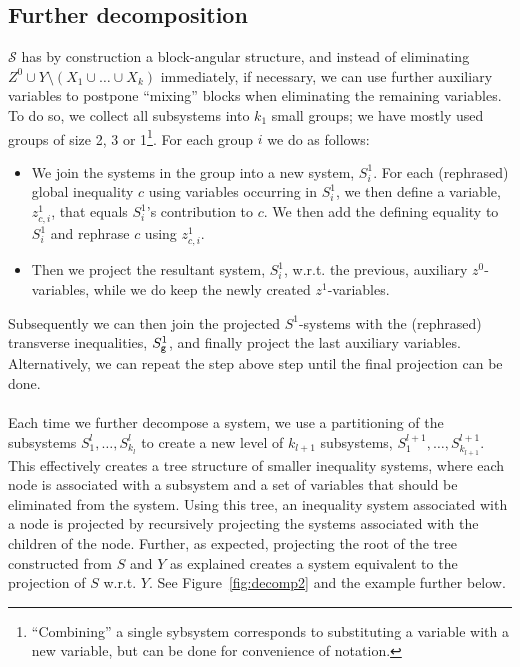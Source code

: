 \subsection{Further decomposition}
$\mathcal{S}$ has by construction a block-angular structure, and instead of eliminating $Z^0\cup Y\setminus(X_1\cup\ldots\cup X_k)$ immediately, if necessary, we can use further auxiliary variables to postpone ``mixing'' blocks when eliminating the remaining variables. 
To do so, we collect all subsystems into $k_1$ small groups; we have mostly used groups of size 2, 3 or 1\footnote{``Combining'' a single sybsystem corresponds to substituting a variable with a new variable, but can be done for convenience of notation.}.
For each group $i$ we do as follows:
\begin{itemize}\itemsep0em
\item We join the systems in the group into a new system, $S^1_i$. For each (rephrased) global inequality $c$ using variables occurring in $S^1_i$, we then define a variable, $z^1_{c,i}$, that equals $S^1_i$'s contribution to $c$. We then add the defining equality to $S^1_i$ and rephrase $c$ using $z^1_{c,i}$.

\item Then we project the resultant system, $S^1_i$, w.r.t. the previous, auxiliary $z^0$-variables, while we do keep the newly created $z^1$-variables.
\end{itemize} 
Subsequently we can then join the projected $S^1$-systems with the (rephrased) transverse inequalities, $S_{\texttt{g}}^1$, and finally project the last auxiliary variables. Alternatively, we can repeat the step above step until the final projection can be done. 
\\\\
Each time we further decompose a system, we use a partitioning of the subsystems $S^l_1, \ldots, S^l_{k_l}$ to create a new level of $k_{l+1}$ subsystems, $S^{l+1}_1,\ldots, S^{l+1}_{k_{l+1}}$. This effectively creates a tree structure of smaller inequality systems, where each node is associated with a subsystem and a set of variables that should be eliminated from the system. 
Using this tree, an inequality system associated with a node is projected by recursively projecting the systems associated with the children of the node. Further, as expected, projecting the root of the tree constructed from $S$ and $Y$ as explained creates a system equivalent to the projection of $S$ w.r.t. $Y$. See Figure~\ref{fig:decomp2} and the example further below.

